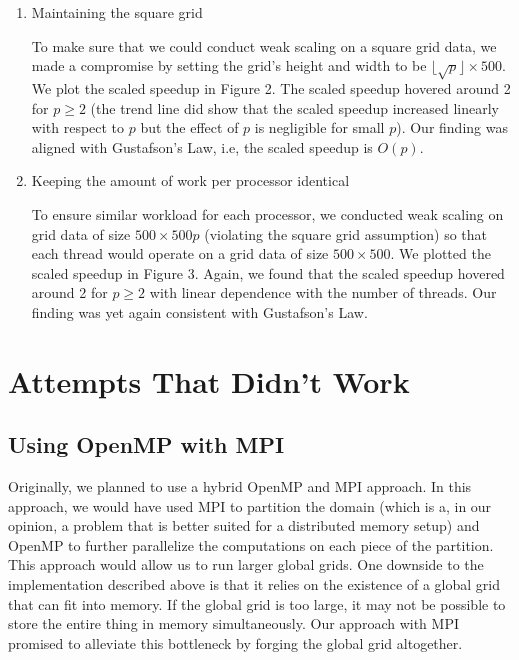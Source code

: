 \documentclass{article}
\begin{document}
\begin{enumerate}
    \item Maintaining the square grid

    To make sure that we could conduct weak scaling on a square grid data, we made a compromise by setting the grid’s height and width to be $\lfloor \sqrt{p} \rfloor \times 500$. We plot the scaled speedup in Figure 2. The scaled speedup hovered around 2 for $p \ge 2$ (the trend line did show that the scaled speedup increased linearly with respect to $p$ but the effect of $p$ is negligible for small $p$). Our finding was aligned with Gustafson’s Law, i.e, the scaled speedup is $O(p)$.

    \item Keeping the amount of work per processor identical

    To ensure similar workload for each processor, we conducted weak scaling on grid data of size $500 \times 500p$ (violating the square grid assumption) so that each thread would operate on a grid data of size $500 \times 500$. We plotted the scaled speedup in Figure 3. Again, we found that the scaled speedup hovered around 2 for $p \ge 2$ with linear dependence with the number of threads. Our finding was yet again consistent with Gustafson’s Law.
\end{enumerate}

\section{Attempts That Didn't Work}

\subsection{Using OpenMP with MPI}

Originally, we planned to use a hybrid OpenMP and MPI approach.
In this approach, we would have used MPI to partition the domain (which is a, in our opinion, a problem that is better suited for a distributed memory setup) and OpenMP to further parallelize the computations on each piece of the partition.
This approach would allow us to run larger global grids.
One downside to the implementation described above is that it relies on the existence of a global grid that can fit into memory.
If the global grid is too large, it may not be possible to store the entire thing in memory simultaneously.
Our approach with MPI promised to alleviate this bottleneck by forging the global grid altogether.
\end{document}
